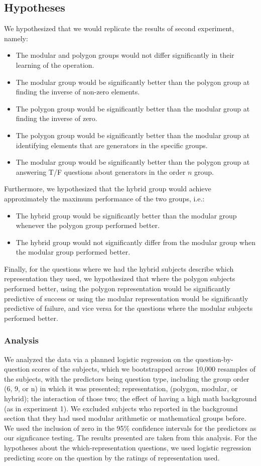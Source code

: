 \documentclass[11pt]{article}
\begin{document}
\subsection{Hypotheses}
We hypothesized that we would replicate the results of second experiment, namely: 
\begin{itemize} 
\item The modular and polygon groups would not differ significantly in their learning of the operation.
\item The modular group would be significantly better than the polygon group at finding the inverse of non-zero elements.
\item The polygon group would be significantly better than the modular group at finding the inverse of zero.
\item The polygon group would be significantly better than the modular group at identifying elements that are generators in the specific groups.
\item The modular group would be significantly better than the polygon group at answering T/F questions about generators in the order $n$ group.
\end{itemize}
Furthermore, we hypothesized that the hybrid group would achieve approximately the maximum performance of the two groups, i.e.: %
\begin{itemize}
\item The hybrid group would be significantly better than the modular group whenever the polygon group performed better.
\item The hybrid group would not significantly differ from the modular group when the modular group performed better.
\end{itemize}
Finally, for the questions where we had the hybrid subjects describe which representation they used, we hypothesized that where the polygon subjects performed better, using the polygon representation would be significantly predictive of success or using the modular representation would be significantly predictive of failure, and vice versa for the questions where the modular subjects performed better.
\subsubsection{Analysis}
We analyzed the data via a planned logistic regression on the question-by-question scores of the subjects, which we bootstrapped across 10,000 resamples of the subjects, with the predictors being question type, including the group order (6, 9, or n) in which it was presented; representation, (polygon, modular, or hybrid); the interaction of those two; the effect of having a high math background (as in experiment 1). We excluded subjects who reported in the background section that they had used modular arithmetic or mathematical groups before. We used the inclusion of zero in the 95\% confidence intervals for the predictors as our signficance testing. The results presented are taken from this analysis. For the hypotheses about the which-representation questions, we used logistic regression predicting score on the question by the ratings of representation used.
\end{document}
